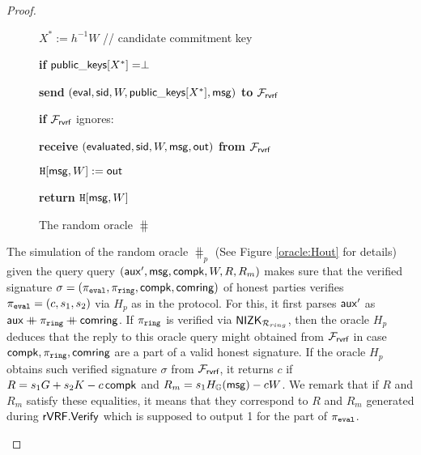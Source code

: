 \begin{proof}
\begin{itemize}
\begin{figure}
\begin{minipage}{0.6\textwidth}
{{						{$ X^* := h^{-1}W $ // candidate commitment key} 
						
						
						{\textbf{if} $ {\mathsf{public\_keys}}[X^*]  = \perp$}
						
						\tabdbl{$ \pk^* \leftsample \grE $} %
						
						\tabdbl{$ \pkeys[X^*] := \pk^* $}
						
						{\textbf{send} $ (\mathsf{eval}, \textsf{sid}, W, {\mathsf{public\_keys}}[X^*] , \mathsf{msg}) $ \textbf{to} $ \mathcal{F}_{\textsf{rvrf}} $}
						
						{\textbf{if} $ \mathcal{F}_{\textsf{rvrf}} $ ignores: }
						
						{\textbf{receive} $ (\mathsf{evaluated}, \textsf{sid}, W, \mathsf{msg}, {\mathsf{out}}) $ \textbf{from} $ \mathcal{F}_{\textsf{rvrf}} $}
						
						{$ \mathtt{H}[\mathsf{msg}, W]:={\mathsf{out}} $}
						
%						
%						
						
						
						\textbf{return $ \mathtt{H}[\mathsf{msg},  W] $}
						
				}}	
				\caption{The random oracle $ \hash $}
				\label{oracle:HnoPK}
			\end{minipage}
		\end{figure}
		


		The simulation of the random oracle $ \hash_p $ (See Figure \ref{oracle:Hout} for details) given the query  query $ (\mathsf{aux}', \mathsf{msg},\mathsf{compk},W,R,R_m)  $ makes sure that the verified signature $ \sigma = (\pi_{\mathtt{eval}}, \pi_{\mathtt{ring}}, \mathsf{compk}, \mathsf{comring}) $ of honest parties verifies $ \pi_{\mathtt{eval}} = (c, s_1,s_2) $ via $ H_p $ as in the protocol. For this, it first parses $ \mathsf{aux}' $ as $\mathsf{aux} \mathbin{+\mkern-10mu+} \pi_{\mathtt{ring}} \mathbin{+\mkern-10mu+} \mathsf{comring} $. If $ \pi_{\mathtt{ring}} $ is verified via $ {\mathsf{NIZK}}_{\mathcal{R}_{ring}} $, then the oracle $ H_p $ deduces that the reply to this oracle query might obtained from $ \mathcal{F}_{\textsf{rvrf}} $ in case $ \mathsf{compk},\pi_{\mathtt{ring}},\mathsf{comring} $ are  a part of a valid honest signature.
		 If the oracle $ H_p $ obtains such verified signature $ \sigma $ from $ \mathcal{F}_{\textsf{rvrf}} $, it returns $ c $ if $ R = s_1 G + s_2 K - c \,\mathsf{compk} $ and $ R_m = s_1 H_{\mathbb{G}}(\mathsf{msg}) - cW $. We remark that if $ R $ and $ R_m $ satisfy these equalities, it means that they correspond to $ R $ and $ R_m $ generated during $ {\mathsf{rVRF}}.{\mathsf{Verify}} $ which is supposed to output 1  for the part of $ \pi_{\mathtt{eval}} $.
		 

\end{itemize}
\end{proof}
